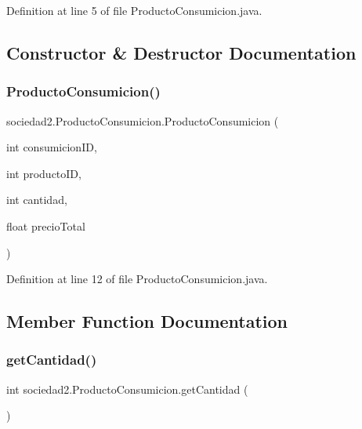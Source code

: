 Definition at line 5 of file Producto\+Consumicion.\+java.



\subsection{Constructor \& Destructor Documentation}
\mbox{\label{classsociedad2_1_1_producto_consumicion_a86e9b27ae98eaa43cc86f87ca2388e60}} 
\subsubsection{\texorpdfstring{Producto\+Consumicion()}{ProductoConsumicion()}}
{\footnotesize\ttfamily sociedad2.\+Producto\+Consumicion.\+Producto\+Consumicion (\begin{DoxyParamCaption}\item[{int}]{consumicion\+ID,  }\item[{int}]{producto\+ID,  }\item[{int}]{cantidad,  }\item[{float}]{precio\+Total }\end{DoxyParamCaption})}



Definition at line 12 of file Producto\+Consumicion.\+java.



\subsection{Member Function Documentation}
\mbox{\label{classsociedad2_1_1_producto_consumicion_a083306b65306926b265c534df7ce902e}} 
\subsubsection{\texorpdfstring{get\+Cantidad()}{getCantidad()}}
{\footnotesize\ttfamily int sociedad2.\+Producto\+Consumicion.\+get\+Cantidad (\begin{DoxyParamCaption}{ }\end{DoxyParamCaption})}



